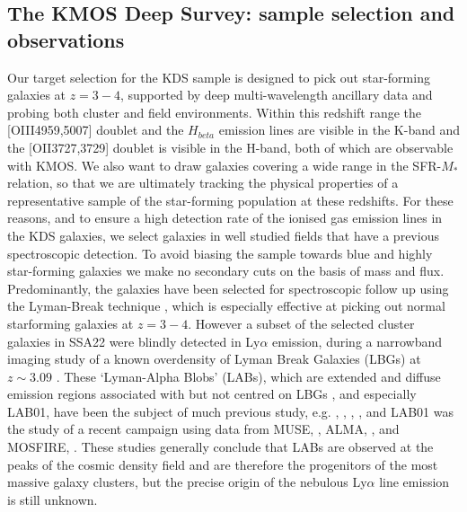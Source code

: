 \documentclass[a4paper,fleqn,usenatbib]{mn2e}
\begin{document}
\subsection{The KMOS Deep Survey: sample selection and observations}
Our target selection for the KDS sample is designed to pick out star-forming galaxies at $z = 3-4$, supported by deep multi-wavelength ancillary data and probing both cluster and field environments.
Within this redshift range the [OIII4959,5007] doublet and the $H_{beta}$ emission lines are visible in the K-band and the [OII3727,3729] doublet is visible in the H-band, both of which are observable with KMOS. 
We also want to draw galaxies covering a wide range in the SFR-$M_{*}$ relation, so that we are ultimately tracking the physical properties of a representative sample of the star-forming population at these redshifts.
For these reasons, and to ensure a high detection rate of the ionised gas emission lines in the KDS galaxies, we select galaxies in well studied fields that have a previous spectroscopic detection.
To avoid biasing the sample towards blue and highly star-forming galaxies we make no secondary cuts on the basis of mass and flux. %
Predominantly, the galaxies have been selected for spectroscopic follow up using the Lyman-Break technique \citep{Steidel1996}, which is especially effective at picking out normal starforming galaxies at $z = 3-4$.
However a subset of the selected cluster galaxies in SSA22 were blindly detected in Ly$\alpha$ emission, during a narrowband imaging study of a known overdensity of Lyman Break Galaxies (LBGs) at $z \sim 3.09$ \citep{Steidel2000}.
These `Lyman-Alpha Blobs' (LABs), which are extended and diffuse emission regions associated with but not centred on LBGs \citep{Steidel2000}, and especially LAB01, have been the subject of much previous study, e.g. \citep{Bower2004a}, \citep{Matsuda2004,Matsuda2007}, \citep{Geach2006,Geach2014}, \citep{Weijmans2010}, \citep{Hayes2011a} and LAB01 was the study of a recent campaign \citep{Geach2016} using data from MUSE, \citep{Bacon2010}, ALMA, \citep{Wootten2009}, and MOSFIRE, \citep{McLean2012}.
These studies generally conclude that LABs are observed at the peaks of the cosmic density field and are therefore the progenitors of the most massive galaxy clusters, but the precise origin of the nebulous Ly$\alpha$ line emission is still unknown.
\end{document}
